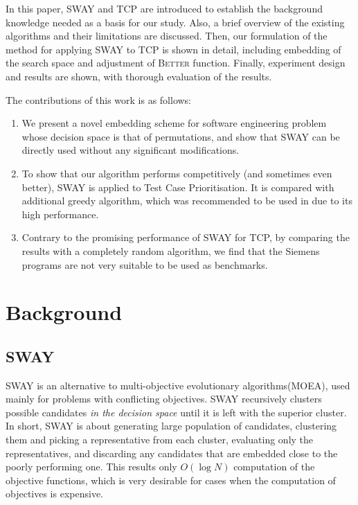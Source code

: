 \documentclass[10pt,journal,compsoc]{IEEEtran}
\begin{document}
	In this paper, SWAY and TCP are introduced to establish the background knowledge needed as a basis for our study. Also, a brief overview of the existing algorithms and their limitations are discussed. Then, our formulation of the method for applying SWAY to TCP is shown in detail, including embedding of the search space and adjustment of \textsc{Better} function. Finally, experiment design and results are shown, with thorough evaluation of the results.
	
	The contributions of this work is as follows:
	\begin{enumerate}
		\item We present a novel embedding scheme for software engineering problem whose decision space is that of permutations, and show that SWAY can be directly used without any significant modifications.
		
		\item To show that our algorithm performs competitively (and sometimes even better), SWAY is applied to Test Case Prioritisation. It is compared with additional greedy algorithm, which was recommended to be used in \cite{LHH07} due to its high performance.
		
		\item Contrary to the promising performance of SWAY for TCP, by comparing the results with a completely random algorithm, we find that the Siemens programs are not very suitable to be used as benchmarks.
	\end{enumerate}
	
	\section{Background}
	
	\subsection{SWAY}
	SWAY\cite{SWAY} is an alternative to multi-objective evolutionary algorithms(MOEA), used mainly for problems with conflicting objectives. SWAY recursively clusters possible candidates {\it in the decision space} until it is left with the superior cluster.
	In short, SWAY is about generating large population of candidates, clustering them and picking a representative from each cluster, evaluating only the representatives, and discarding any candidates that are embedded close to the poorly performing one. This results only $O(\log N)$ computation of the objective functions, which is very desirable for cases when the computation of objectives is expensive.
	
\end{document}
